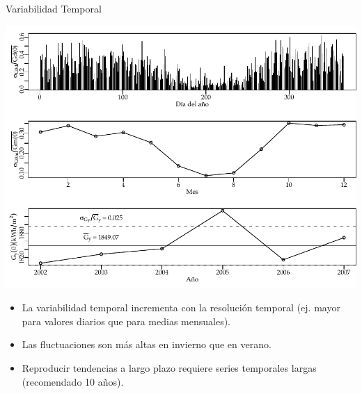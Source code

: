 \documentclass[xcolor={usenames,svgnames,dvipsnames}]{beamer}
\begin{document}
\begin{frame}[label={sec:orgb01b294}]{Variabilidad Temporal}
\begin{center}
\includegraphics[height=0.45\textheight]{../figs/VariabilidadRadiacionDiario.pdf}
\end{center}

\begin{itemize}
\item La variabilidad temporal \alert{incrementa con la resolución temporal} (ej. mayor para valores diarios que para medias mensuales).
\item Las fluctuaciones son \alert{más altas en invierno que en verano}.
\item Reproducir \alert{tendencias a largo plazo} requiere \alert{series temporales largas} (recomendado 10 años).
\end{itemize}
\end{frame}
\end{document}

